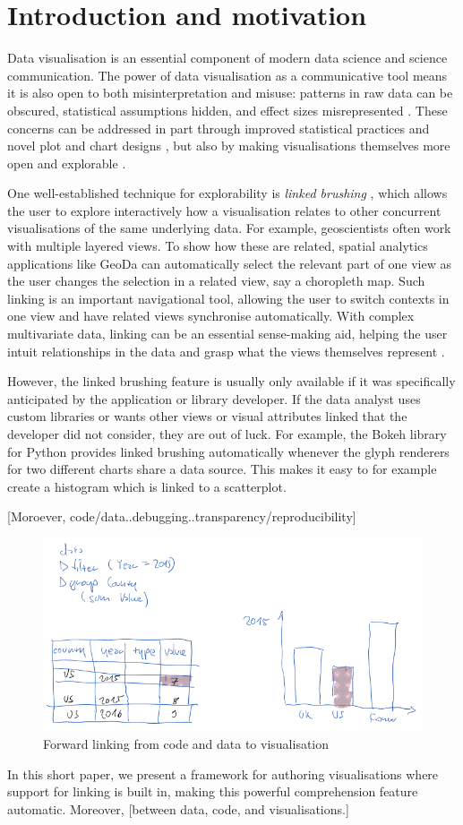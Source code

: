 \section{Introduction and motivation}

Data visualisation is an essential component of modern data science and science
communication. The power of data visualisation as a communicative tool means it
is also open to both misinterpretation and misuse: patterns in raw data can be
obscured, statistical assumptions hidden, and effect sizes misrepresented
\cite{weissgerber15}. These concerns can be addressed in part through improved
statistical practices and novel plot and chart designs \cite{allen19}, but also
by making visualisations themselves more open and explorable
\cite{dragicevic19}.

One well-established technique for explorability is \emph{linked brushing}
\cite{fisherkeller75,becker87,buja91}, which allows the user to explore
interactively how a visualisation relates to other concurrent visualisations of
the same underlying data. For example, geoscientists often work with multiple
layered views. To show how these are related, spatial analytics applications
like GeoDa \cite{anselin06} can automatically select the relevant part of one
view as the user changes the selection in a related view, say a choropleth map.
Such linking is an important navigational tool, allowing the user to switch
contexts in one view and have related views synchronise automatically. With
complex multivariate data, linking can be an essential sense-making aid, helping
the user intuit relationships in the data and grasp what the views themselves
represent \cite{he18}.

However, the linked brushing feature is usually only available if it was
specifically anticipated by the application or library developer. If the data
analyst uses custom libraries or wants other views or visual attributes linked
that the developer did not consider, they are out of luck. For example, the
Bokeh library for Python \cite{jolly18} provides linked brushing automatically
whenever the glyph renderers for two different charts share a data source. This
makes it easy to for example create a histogram which is linked to a
scatterplot.

[Moroever, code/data..debugging..transparency/reproducibility]

\begin{figure}[H]
\includegraphics[scale=0.35]{image/chart-fwd}
\caption{Forward linking from code and data to visualisation}
\end{figure}

In this short paper, we present a framework for authoring visualisations where
support for linking is built in, making this powerful comprehension feature
automatic. Moreover, [between data, code, and visualisations.]

